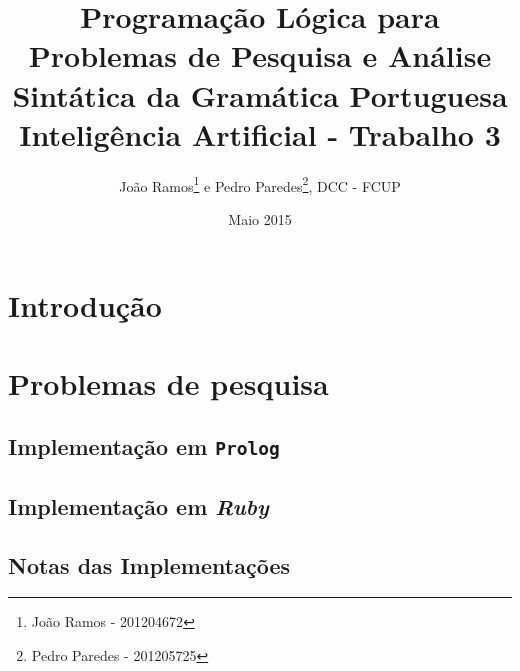 \documentclass[12pt,a4paper,oneside]{article}
\title{Programação Lógica para Problemas de Pesquisa e Análise Sintática da Gramática Portuguesa\\
  \vspace{0.1in}
  \large{Inteligência Artificial - Trabalho 3}
}
\author{João Ramos\footnote{João Ramos - 201204672} e Pedro Paredes\footnote{Pedro Paredes - 201205725}, DCC - FCUP}
\date{Maio 2015}
\begin{document}
\maketitle


\section{Introdução}
\label{sec:intro}

\lipsum[1]

\lipsum[2]


\section{Problemas de pesquisa}
\label{sec:algconc}

\lipsum[1]

\subsection{Implementação em \texttt{Prolog}}

\lipsum[1]

\lipsum[2]

\lipsum[3]

\subsection{Implementação em \textit{Ruby}}

\lipsum[1]

\lipsum[2]

\lipsum[3]

\subsection{Notas das Implementações}

\lipsum[1]

\lipsum[2]

\end{document}
